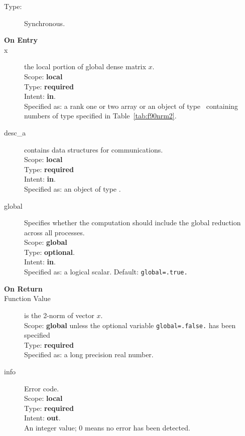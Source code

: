 \begin{description}
\item[Type:] Synchronous.
\item[\bf On Entry]
\item[x] the local portion of global dense matrix
$x$.%
\\
Scope: {\bf local} \\
Type: {\bf required} \\
Intent: {\bf in}.\\
Specified as:  a rank one or two array or an object of type \vdata\ 
containing numbers of type specified in
Table~\ref{tab:f90nrm2}.
\item[desc\_a] contains data structures for communications.\\
Scope: {\bf local} \\
Type: {\bf required}\\
Intent: {\bf in}.\\
Specified as: an object of type \descdata.
\item[global]  Specifies whether the computation should include the
  global reduction across all processes.\\
Scope: {\bf global} \\
Type: {\bf optional}.\\
Intent: {\bf in}.\\
Specified as: a logical scalar.
Default: \verb|global=.true.|\\%

\item[\bf On Return] 
\item[Function Value] is the 2-norm of vector $x$.\\
Scope: {\bf global} unless the optional variable
\verb|global=.false.| has been specified\\
Type: {\bf required} \\
Specified as: a long precision real number.
\item[info] Error code.\\
Scope: {\bf local} \\
Type: {\bf required} \\
Intent: {\bf out}.\\
An integer value; 0 means no error has been detected. 
\end{description}

